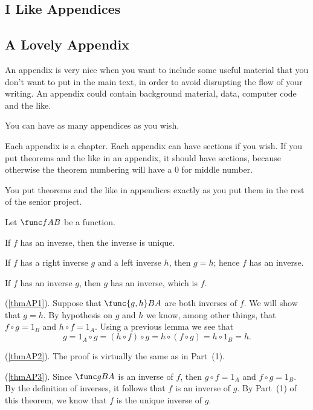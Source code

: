 \documentclass[11pt, twoside, reqno]{book}
\begin{document}
\begin{appdices}

\chapter{I Like Appendices}

\section{A Lovely Appendix}

An appendix is very nice when you want to include some useful material that you don't want to put in the main text, in order to avoid disrupting the flow of your writing.  An appendix could contain background material, data, computer code and the like.

You can have as many appendices as you wish.

Each appendix is a chapter.  Each appendix can have sections if you wish.  If you put theorems and the like in an appendix, it should have sections, because otherwise the theorem numbering will have a $0$ for middle number.

You put theorems and the like in appendices exactly as you put them in the rest of the senior project.

\thm\label{thmAP} 
Let $\func fAB$ be a function.
%
\enum 
\item\label{thmAP1}
If $f$ has an inverse, then the inverse is unique.
%
\item\label{thmAP2}
If $f$ has a right inverse $g$ and a left inverse $h$, then $g = h$; hence $f$ has an inverse.
%
\item\label{thmAP3}
If $f$ has an inverse $g$, then $g$ has an inverse, which is $f$.
\eenum
\ethm
 
\demo
(\ref{thmAP1}). Suppose that $\func {g, h}BA$ are both inverses of $f$.  We will show that $g = h$.  By hypothesis on $g$ and $h$ we know, among other things, that $f \circ g = 1_B$ and $h \circ f = 1_A$.  Using a previous lemma we see that
%
\[
g  =  1_A \circ g  =  (h \circ f) \circ g  =  h \circ (f \circ g)  =  h \circ 1_B  =  h.
\]

\noindent (\ref{thmAP2}). The proof is virtually the same as in Part~(1).  
\smallskip

\noindent (\ref{thmAP3}).  Since $\func gBA$ is an inverse of $f$, then $g \circ f = 1_A$ and $f \circ g = 1_B$.  By the definition of inverses, it follows that $f$ is an inverse of $g$.  By Part~(1) of this theorem, we know that $f$ is the unique inverse of $g$.
\edemo
\end{appdices}
\end{document}
